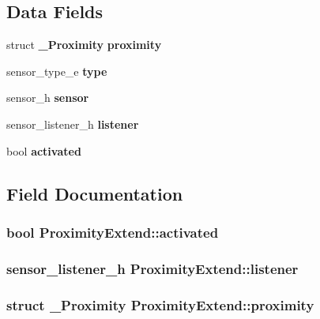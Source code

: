\subsection*{Data Fields}
\begin{DoxyCompactItemize}
\item 
struct {\bf \-\_\-\-Proximity} {\bfseries proximity}\label{structProximityExtend_aa23ee9137320971eda894263328dc829}

\item 
sensor\-\_\-type\-\_\-e {\bfseries type}\label{structProximityExtend_ab777050f6cb4c5adc673c65824a65ebb}

\item 
sensor\-\_\-h {\bfseries sensor}\label{structProximityExtend_a485fb40b759300548e8bd3fd71812dfb}

\item 
sensor\-\_\-listener\-\_\-h {\bfseries listener}\label{structProximityExtend_affd6bf908e0aa663ef9811760794c3dc}

\item 
bool {\bfseries activated}\label{structProximityExtend_a74280059fc7383837cb76b4a6789a405}

\end{DoxyCompactItemize}


\subsection{Field Documentation}
\subsubsection[{activated}]{\setlength{\rightskip}{0pt plus 5cm}bool Proximity\-Extend\-::activated}\label{structProximityExtend_a74280059fc7383837cb76b4a6789a405}
\subsubsection[{listener}]{\setlength{\rightskip}{0pt plus 5cm}sensor\-\_\-listener\-\_\-h Proximity\-Extend\-::listener}\label{structProximityExtend_affd6bf908e0aa663ef9811760794c3dc}
\subsubsection[{proximity}]{\setlength{\rightskip}{0pt plus 5cm}struct {\bf \-\_\-\-Proximity} Proximity\-Extend\-::proximity}\label{structProximityExtend_aa23ee9137320971eda894263328dc829}
